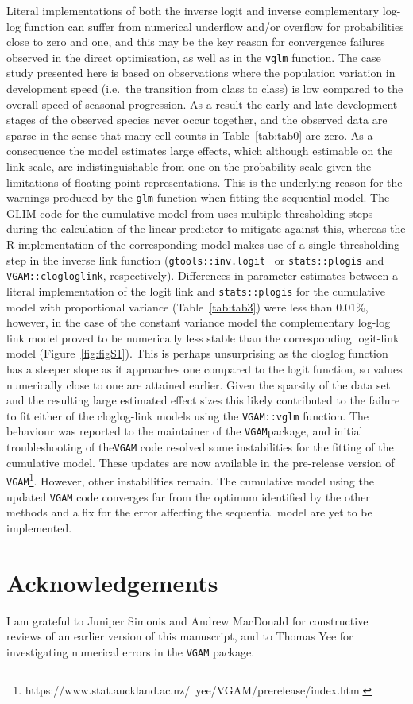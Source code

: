 Literal implementations of both the inverse logit and inverse complementary log-log function can suffer from numerical underflow and/or overflow for probabilities close to zero and one, and this may be the key reason for convergence failures observed in the direct optimisation, as well as in the \verb+vglm+ function. 
The case study presented here is based on observations where the population variation in development speed (i.e.\ the transition from class to class) is low compared to the overall speed of seasonal progression.
As a result the early and late development stages of the observed species never occur together, and the observed data are sparse in the sense that many cell counts in Table~\ref{tab:tab0} are zero.
As a consequence the model estimates large effects, which although estimable on the link scale, are indistinguishable from one on the probability scale given the limitations of floating point representations.
This is the underlying reason for the warnings produced by the \verb+glm+ function when fitting the sequential model.
The GLIM code for the cumulative model from \citep{candy1990biology} uses multiple thresholding steps during the calculation of the linear predictor to mitigate against this, whereas the R implementation of the corresponding model makes use of a single thresholding step in the inverse link function (\verb+gtools::inv.logit+~\citep{gtools} or \verb+stats::plogis+ and \verb+VGAM::clogloglink+, respectively). 
Differences in parameter estimates between a literal implementation of the logit link and  \verb+stats::plogis+ for the cumulative model with proportional variance (Table~\ref{tab:tab3}) were less than 0.01\%, however, in the case of the constant variance model the complementary log-log link model proved to be numerically less stable than the corresponding logit-link model (Figure~\ref{fig:figS1}). 
This is perhaps unsurprising as the cloglog function has a steeper slope as it approaches one compared to the logit function, so values numerically close to one are attained earlier.
Given the sparsity of the data set and the resulting large estimated effect sizes this likely contributed to the failure to fit either of the cloglog-link models using the \verb+VGAM::vglm+ function.
The behaviour was reported to the maintainer of the \verb+VGAM+package, and initial troubleshooting of the\verb+VGAM+ code resolved some instabilities for the fitting of the cumulative model.
These updates are now available in the pre-release version of \verb+VGAM+\footnote{https://www.stat.auckland.ac.nz/~yee/VGAM/prerelease/index.html}.
However, other instabilities remain. 
The cumulative model using the updated \verb+VGAM+ code converges far from the optimum identified by the other methods and a fix for the error affecting the sequential model are yet to be implemented.

\section*{Acknowledgements}
I am grateful to Juniper Simonis and Andrew MacDonald for constructive reviews of an earlier version of this manuscript, and to Thomas Yee for investigating numerical errors in the \verb+VGAM+ package.

\afterpage{\clearpage}
